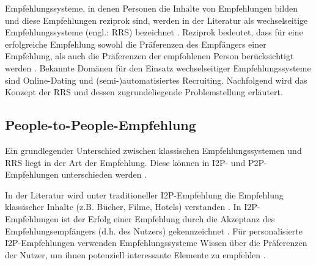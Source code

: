 Empfehlungssysteme, in denen Personen die Inhalte von Empfehlungen bilden und diese Empfehlungen reziprok sind, werden in der Literatur als wechselseitige Empfehlungssysteme (engl.: \ac{RRS}) bezeichnet \cite[S. 35]{li:inproceedings}\cite[S. 2199]{akehurst:inproceedings}\cite[S. 207]{pizzato:2010}.
Reziprok bedeutet, dass für eine erfolgreiche Empfehlung sowohl die Präferenzen des Empfängers einer Empfehlung, als auch die Präferenzen der empfohlenen Person berücksichtigt werden \cite[S. 447]{pizzato:2013}\cite[S. 22]{kleinerman:inproceedings}.
Bekannte Domänen für den Einsatz wechselseitiger Empfehlungssysteme sind Online-Dating und (semi-)automatisiertes Recruiting.
Nachfolgend wird das Konzept der \ac{RRS} und dessen zugrundeliegende Problemstellung erläutert.

\subsection{People-to-People-Empfehlung}%
\label{ch:empfehlungssysteme:rrs:people_to_people}
Ein grundlegender Unterschied zwischen klassischen Empfehlungssystemen und \ac{RRS} liegt in der Art der Empfehlung.
Diese können in \ac{I2P}- und \ac{P2P}-Empfehlungen unterschieden werden \cite[S. 62f.]{kim:inproceedings}.

In der Literatur wird unter traditioneller \ac{I2P}-Empfehlung die Empfehlung klassischer Inhalte (z.B. Bücher, Filme, Hotels) verstanden \cite[S. 2199]{akehurst:inproceedings}\cite[S. 2429]{palomares:inproceedings}.
In \ac{I2P}-Empfehlungen ist der Erfolg einer Empfehlung durch die Akzeptanz des Empfehlungsempfängers (d.h. des Nutzers) gekennzeichnet \cite[S. 131]{kleinerman:2:inproceedings}\cite[S. 546]{koprinska:inbook}.
Für personalisierte \ac{I2P}-Empfehlungen verwenden Empfehlungssysteme Wissen über die Präferenzen der Nutzer, um ihnen potenziell interessante Elemente zu empfehlen \cite[S. 403]{terveen:article}.


